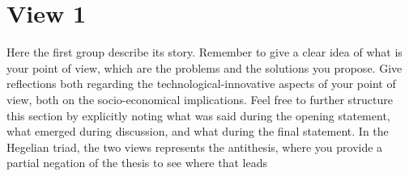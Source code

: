 \section{View 1}
Here the first group describe its story. Remember to give a clear idea of what is your point of view, which are the problems and the solutions you propose. Give reflections both regarding the technological-innovative aspects of your point of view, both on the socio-economical implications. Feel free to further structure this section by explicitly noting what was said during the opening statement, what emerged during discussion, and what during the final statement. In the Hegelian triad, the two views represents the antithesis, where you provide a partial negation of the thesis to see where that leads